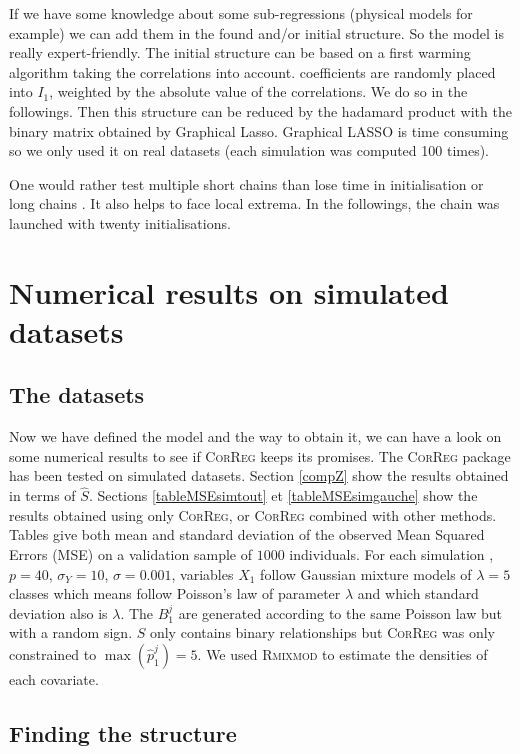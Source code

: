 \documentclass[11pt,a4paper]{article}
\begin{document}
 If we have some knowledge about some sub-regressions (physical models for example) we can add them in the found and/or initial structure. So the model is really expert-friendly.
The initial structure can be based on a first warming algorithm taking the correlations into account. coefficients are randomly placed into $I_1$, weighted by the absolute value of the correlations. We do so in the followings. Then this structure can be reduced by the hadamard product with the binary matrix obtained by Graphical Lasso\cite{friedman2008sparse}. Graphical LASSO is time consuming so we only used it on real datasets (each simulation was computed 100 times).		

	One would rather test multiple short chains than lose time in initialisation or long chains \cite{gilks1996markov}. It also helps to face local extrema. In the followings, the chain was launched with twenty initialisations.
	
\section{Numerical results on simulated datasets}
	\subsection{The datasets}	
	Now we have defined the model and the way to obtain it, we can have a look on some numerical results to see if \textsc{CorReg} 	keeps its promises.
	The \textsc{CorReg} package has been tested on simulated datasets. 
Section \ref{compZ} show the results obtained in terms of $\hat{S}$. Sections \ref{tableMSEsimtout} et \ref{tableMSEsimgauche} show the results obtained using only \textsc{CorReg}, or \textsc{CorReg} combined with other methods. Tables give both mean and standard deviation of the observed Mean Squared Errors (MSE) on a validation sample of $1 000$ individuals. For each simulation ,  $p=40$, $\sigma_Y=10$, $\sigma=0.001$, variables $X_1$ follow Gaussian mixture models of $\lambda=5$ classes which means follow Poisson's law of parameter $\lambda$ and which standard deviation also is $\lambda$. The $B_1^j$ are generated according to the same Poisson law but with a random sign. $S$ only contains binary relationships but \textsc{CorReg} was only constrained to $\max (\hat{p}_1^j)=5$.  
	We used \textsc{Rmixmod} to estimate the densities of each covariate.
	
		\subsection{Finding the structure}
\end{document}
